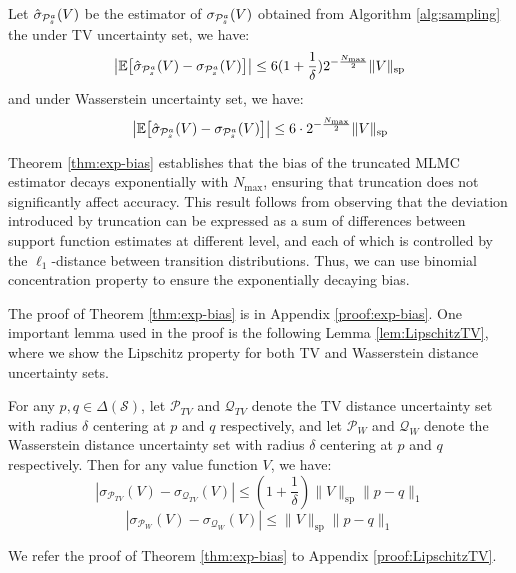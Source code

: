 \begin{theorem}
\label{thm:exp-bias}
Let $\hat{\sigma}_{\mathcal{P}^a_s}(V)$ be the estimator of ${\sigma}_{\mathcal{P}^a_s}(V)$ obtained from Algorithm \ref{alg:sampling} the under TV uncertainty set, we have:
\begin{equation}
\left | \mathbb{E}\bigl[\hat{\sigma}_{\mathcal{P}^a_s}(V) - {\sigma}_{\mathcal{P}^a_s}(V)\bigr]  \right | \leq
6(1+\frac{1}{\delta}) 2^{-\frac{N_{\max}}{2}}\|V\|_{\mathrm{sp}}
\end{equation}
and under Wasserstein uncertainty set, we have:
\begin{equation}
\left | \mathbb{E}\bigl[\hat{\sigma}_{\mathcal{P}^a_s}(V) - {\sigma}_{\mathcal{P}^a_s}(V)\bigr]  \right | \leq
6\cdot 2^{-\frac{N_{\max}}{2}}\|V\|_{\mathrm{sp}}
\end{equation}
\end{theorem}
Theorem \ref{thm:exp-bias} establishes that the bias of the truncated MLMC estimator decays exponentially with $N_{\max}$, ensuring that truncation does not significantly affect accuracy. This result follows from observing that the deviation introduced by truncation can be expressed as a sum of differences between support function estimates at different level, and each of which is controlled by the $\ell_1$-distance between transition distributions. Thus, we can use binomial concentration property to ensure the exponentially decaying bias.

The proof of Theorem \ref{thm:exp-bias} is in Appendix \ref{proof:exp-bias}. One important lemma used in the proof is the following Lemma \ref{lem:LipschitzTV}, where we show the Lipschitz property for both TV and Wasserstein distance uncertainty sets.

\begin{lemma}
\label{lem:LipschitzTV}
For any $p,q \in \Delta(\mathcal{S})$, let $\mathcal{P}_{TV}$ and $\mathcal{Q}_{TV}$ denote the TV distance uncertainty set with radius $\delta$ centering at $p$ and $q$ respectively, and let $\mathcal{P}_{W}$ and $\mathcal{Q}_{W}$ denote the Wasserstein distance uncertainty set with radius $\delta$ centering at $p$ and $q$ respectively. Then for any value function $V$, we have:
\begin{equation} \label{eq:TVlipschitz}
|\sigma_{\mathcal{P}_{TV}} (V) - \sigma_{\mathcal{Q}_{TV}} (V)| \leq (1+\frac{1}{\delta})\|V\|_{\mathrm{sp}}\|p-q\|_1 
\end{equation}
\begin{equation} \label{eq:Wlipschitz}
|\sigma_{\mathcal{P}_{W}} (V) - \sigma_{\mathcal{Q}_{W}} (V)| \leq \|V\|_{\mathrm{sp}}\|p-q\|_1 
\end{equation}
\end{lemma}
We refer the proof of Theorem \ref{thm:exp-bias} to Appendix \ref{proof:LipschitzTV}.

